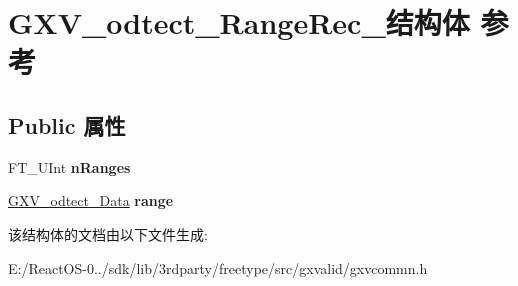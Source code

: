 \hypertarget{struct_g_x_v__odtect___range_rec__}{}\section{G\+X\+V\+\_\+odtect\+\_\+\+Range\+Rec\+\_\+结构体 参考}
\label{struct_g_x_v__odtect___range_rec__}
\subsection*{Public 属性}
\begin{DoxyCompactItemize}
\item 
\mbox{\label{struct_g_x_v__odtect___range_rec___a4efa4fef5ec79fcf929e31365d392a24}} 
F\+T\+\_\+\+U\+Int {\bfseries n\+Ranges}
\item 
\mbox{\label{struct_g_x_v__odtect___range_rec___a2b1faf221e0b494e4d51d7c9f9217e11}} 
\hyperlink{struct_g_x_v__odtect___data_rec__}{G\+X\+V\+\_\+odtect\+\_\+\+Data} {\bfseries range}
\end{DoxyCompactItemize}


该结构体的文档由以下文件生成\+:\begin{DoxyCompactItemize}
\item 
E\+:/\+React\+O\+S-\/0../sdk/lib/3rdparty/freetype/src/gxvalid/gxvcommn.\+h\end{DoxyCompactItemize}
